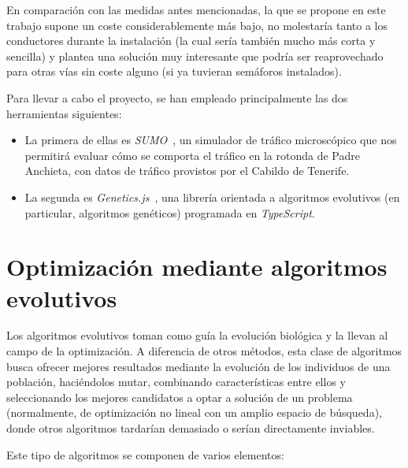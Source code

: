 En comparación con las medidas antes mencionadas, la que se propone en este trabajo supone un coste considerablemente más bajo, no molestaría tanto a los conductores durante la instalación (la cual sería también mucho más corta y sencilla) y plantea una solución muy interesante que podría ser reaprovechado para otras vías sin coste alguno (si ya tuvieran semáforos instalados).

Para llevar a cabo el proyecto, se han empleado principalmente las dos herramientas siguientes:

\begin{itemize}
    \item La primera de ellas es \textit{SUMO}~\cite{lopez_microscopic_2018}, un simulador de tráfico microscópico que nos permitirá evaluar cómo se comporta el tráfico en la rotonda de Padre Anchieta, con datos de tráfico provistos por el Cabildo de Tenerife.
    \item La segunda es \textit{Genetics.js}~\cite{abrante_dorta_framework_2019}, una librería orientada a algoritmos evolutivos (en particular, algoritmos genéticos) programada en \textit{TypeScript}.
\end{itemize}


\section{Optimización mediante algoritmos evolutivos}

Los algoritmos evolutivos toman como guía la evolución biológica y la llevan al campo de la optimización. A diferencia de otros métodos, esta clase de algoritmos busca ofrecer mejores resultados mediante la evolución de los individuos de una población, haciéndolos mutar, combinando características entre ellos y seleccionando los mejores candidatos a optar a solución de un problema~\cite{eiben_introduction_2003} (normalmente, de optimización no lineal con un amplio espacio de búsqueda), donde otros algoritmos tardarían demasiado o serían directamente inviables.

Este tipo de algoritmos se componen de varios elementos:

